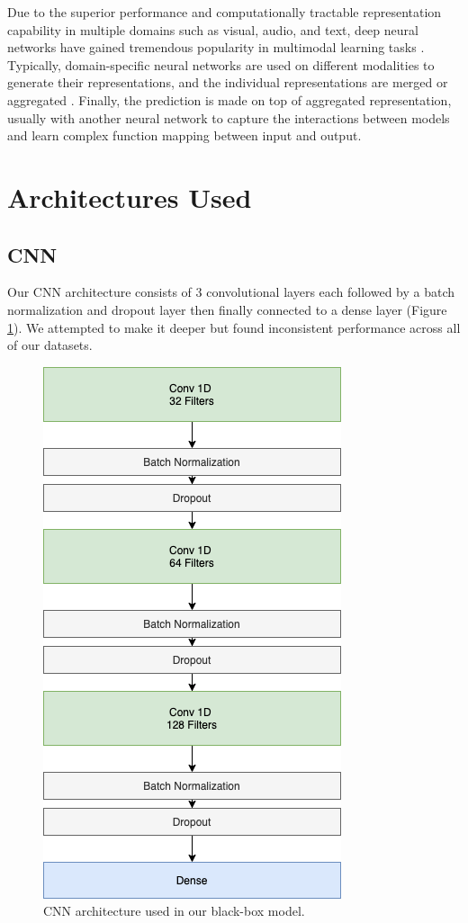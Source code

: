 \documentclass{turabian-thesis}
\begin{document}
Due to the superior performance and computationally tractable representation capability in multiple domains such as visual, audio, and text, deep neural networks have gained tremendous popularity in multimodal learning tasks \cite{kim_multimodal_2018}. Typically, domain-specific neural networks are used on different modalities to generate their representations, and the individual representations are merged or aggregated \cite{liu_learn_2018}. Finally, the prediction is made on top of aggregated representation, usually with another neural network to capture the interactions between models and learn complex function mapping between input and output.


\section{Architectures Used}

\subsection{CNN}

Our CNN architecture consists of 3 convolutional layers each followed by a batch normalization and dropout layer then finally connected to a dense layer (Figure \ref{fig:cnn_model}). We attempted to make it deeper but found inconsistent performance across all of our datasets.

\begin{figure}[h!]
   \begin{center}
      \includegraphics[scale=0.6]{../media/cnn_model.png}
   \end{center}
   \caption{CNN architecture used in our black-box model.}  
    \label{fig:cnn_model}
\end{figure}
\end{document}
